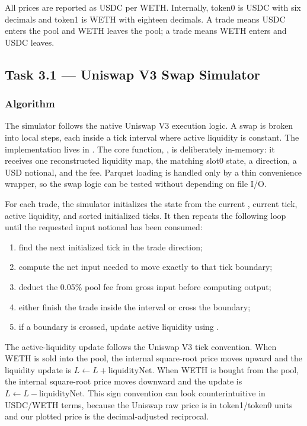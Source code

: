 All prices are reported as USDC per WETH.  Internally, token0 is USDC with six
decimals and token1 is WETH with eighteen decimals.  A  trade
means USDC enters the pool and WETH leaves the pool; a  trade
means WETH enters and USDC leaves.

\subsection{Task 3.1 --- Uniswap V3 Swap Simulator}
\label{subsec:m3-task31}

\subsubsection{Algorithm}
\label{subsubsec:m3-algo}

The simulator follows the native Uniswap V3 execution logic.  A swap is broken
into local steps, each inside a tick interval where active liquidity is
constant.  The implementation lives in
.  The core function,
, is deliberately in-memory: it receives one reconstructed
liquidity map, the matching slot0 state, a direction, a USD notional, and the
fee.  Parquet loading is handled only by a thin convenience wrapper, so the
swap logic can be tested without depending on file I/O.

For each trade, the simulator initializes the state from the current
, current tick, active liquidity, and sorted initialized
ticks.  It then repeats the following loop until the requested input notional
has been consumed:
\begin{enumerate}
    \item find the next initialized tick in the trade direction;
    \item compute the net input needed to move exactly to that tick boundary;
    \item deduct the 0.05\% pool fee from gross input before computing output;
    \item either finish the trade inside the interval or cross the boundary;
    \item if a boundary is crossed, update active liquidity using
    .
\end{enumerate}

The active-liquidity update follows the Uniswap V3 tick convention.  When WETH
is sold into the pool, the internal square-root price moves upward and the
liquidity update is $L \leftarrow L + \mathrm{liquidityNet}$.  When WETH is
bought from the pool, the internal square-root price moves downward and the
update is $L \leftarrow L - \mathrm{liquidityNet}$.  This sign convention can
look counterintuitive in USDC/WETH terms, because the Uniswap raw price is in
token1/token0 units and our plotted price is the decimal-adjusted reciprocal.

